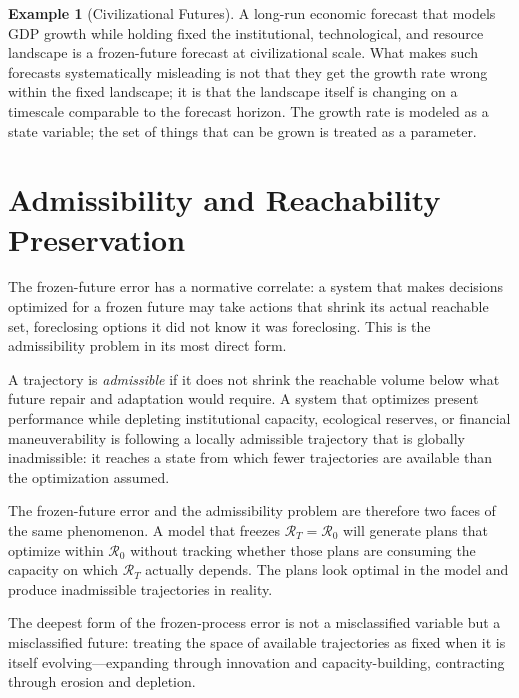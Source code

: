 \documentclass[11pt]{book}
\theoremstyle{plain}
\theoremstyle{definition}
\newtheorem{example}[theorem]{Example}
\theoremstyle{remark}
\begin{document}
\begin{example}[Civilizational Futures]
A long-run economic forecast that models GDP growth while holding fixed the institutional, technological, and resource landscape is a frozen-future forecast at civilizational scale. What makes such forecasts systematically misleading is not that they get the growth rate wrong within the fixed landscape; it is that the landscape itself is changing on a timescale comparable to the forecast horizon. The growth rate is modeled as a state variable; the set of things that can be grown is treated as a parameter.
\end{example}

\section{Admissibility and Reachability Preservation}

The frozen-future error has a normative correlate: a system that makes decisions optimized for a frozen future may take actions that shrink its actual reachable set, foreclosing options it did not know it was foreclosing. This is the admissibility problem in its most direct form.

A trajectory is \emph{admissible} if it does not shrink the reachable volume below what future repair and adaptation would require. A system that optimizes present performance while depleting institutional capacity, ecological reserves, or financial maneuverability is following a locally admissible trajectory that is globally inadmissible: it reaches a state from which fewer trajectories are available than the optimization assumed.

The frozen-future error and the admissibility problem are therefore two faces of the same phenomenon. A model that freezes $\mathcal{R}_T = \mathcal{R}_0$ will generate plans that optimize within $\mathcal{R}_0$ without tracking whether those plans are consuming the capacity on which $\mathcal{R}_T$ actually depends. The plans look optimal in the model and produce inadmissible trajectories in reality.

\begin{tcolorbox}[title={Frozen Futures}]
The deepest form of the frozen-process error is not a misclassified variable but a misclassified future: treating the space of available trajectories as fixed when it is itself evolving---expanding through innovation and capacity-building, contracting through erosion and depletion.
\end{tcolorbox}
\end{document}
